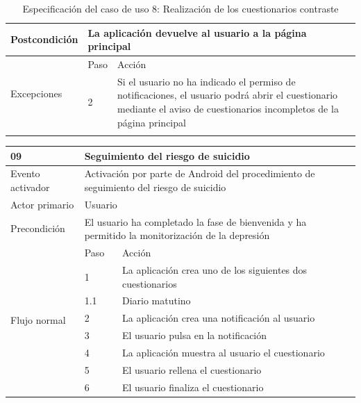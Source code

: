 \begin{table}[h]
\begin{tabularx}{\textwidth}{|l|l|X|}
            \hline
            Postcondición & \multicolumn{2}{|X|}{La aplicación devuelve al usuario a la página principal} \\
            \hline
            \multirow{2}{*}{Excepciones}  & Paso & Acción \\
            \cline{2-3} & 2 & Si el usuario no ha indicado el permiso de notificaciones, el usuario podrá abrir el cuestionario mediante el aviso de cuestionarios incompletos de la página principal \\
            \hline
            \caption{Especificación del caso de uso 8: Realización de los cuestionarios contraste}
            \label{tabla:casos_uso:realizacion_contraste}
        \end{tabularx}
    \end{table}

    \begin{table}[h]
        \centering
        \begin{tabularx}{\textwidth}{|l|l|X|}
            \hline
            09 & \multicolumn{2}{|X|}{Seguimiento del riesgo de suicidio} \\
            \hline
            Evento activador & \multicolumn{2}{|X|}{Activación por parte de Android del procedimiento de seguimiento del riesgo de suicidio} \\
            \hline
            Actor primario & \multicolumn{2}{|X|}{Usuario} \\
            \hline
            Precondición & \multicolumn{2}{|X|}{El usuario ha completado la fase de bienvenida y ha permitido la monitorización de la depresión} \\
            \hline
            \multirow{11}{*}{Flujo normal} & Paso & Acción \\
            \cline{2-3} & 1 & La aplicación crea uno de los siguientes dos cuestionarios \\
            \cline{2-3} & 1.1 & Diario matutino \\
            \cline{2-3} & 2 & La aplicación crea una notificación al usuario \\
            \cline{2-3} & 3 & El usuario pulsa en la notificación \\
            \cline{2-3} & 4 & La aplicación muestra al usuario el cuestionario \\
            \cline{2-3} & 5 & El usuario rellena el cuestionario \\
            \cline{2-3} & 6 & El usuario finaliza el cuestionario \\

\end{tabularx}
\end{table}
